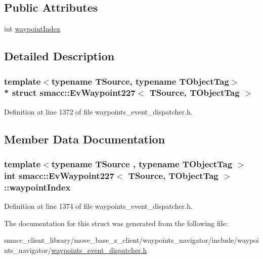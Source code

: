 \subsection*{Public Attributes}
\begin{DoxyCompactItemize}
\item 
int \hyperlink{structsmacc_1_1EvWaypoint227_a4b66afa425801fce560f9b40e1857ba6}{waypoint\+Index}
\end{DoxyCompactItemize}


\subsection{Detailed Description}
\subsubsection*{template$<$typename T\+Source, typename T\+Object\+Tag$>$\\*
struct smacc\+::\+Ev\+Waypoint227$<$ T\+Source, T\+Object\+Tag $>$}



Definition at line 1372 of file waypoints\+\_\+event\+\_\+dispatcher.\+h.



\subsection{Member Data Documentation}
\subsubsection[{\texorpdfstring{waypoint\+Index}{waypointIndex}}]{\setlength{\rightskip}{0pt plus 5cm}template$<$typename T\+Source , typename T\+Object\+Tag $>$ int {\bf smacc\+::\+Ev\+Waypoint227}$<$ T\+Source, T\+Object\+Tag $>$\+::waypoint\+Index}\hypertarget{structsmacc_1_1EvWaypoint227_a4b66afa425801fce560f9b40e1857ba6}{}\label{structsmacc_1_1EvWaypoint227_a4b66afa425801fce560f9b40e1857ba6}


Definition at line 1374 of file waypoints\+\_\+event\+\_\+dispatcher.\+h.



The documentation for this struct was generated from the following file\+:\begin{DoxyCompactItemize}
\item 
smacc\+\_\+client\+\_\+library/move\+\_\+base\+\_\+z\+\_\+client/waypoints\+\_\+navigator/include/waypoints\+\_\+navigator/\hyperlink{waypoints__event__dispatcher_8h}{waypoints\+\_\+event\+\_\+dispatcher.\+h}\end{DoxyCompactItemize}
